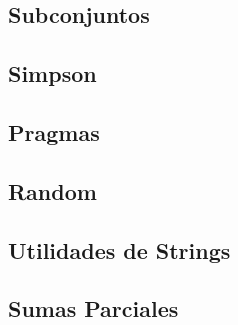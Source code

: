 \documentclass[a4paper,10pt,twocolumn]{article}
\begin{document}
\subsection{Subconjuntos}

\subsection{Simpson}

\subsection{Pragmas}

\subsection{Random}

\subsection{Utilidades de Strings}

\subsection{Sumas Parciales}


\newpage

\end{document}
